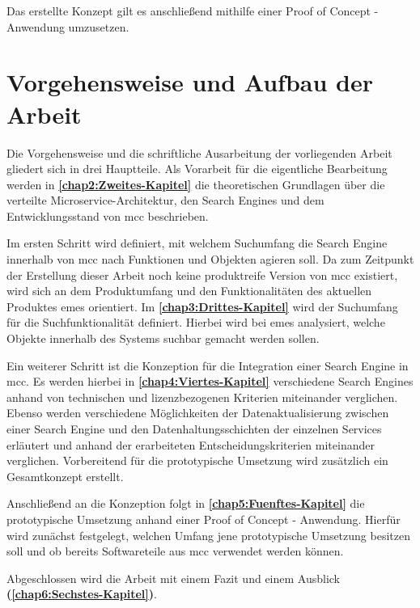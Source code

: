 Das erstellte Konzept gilt es anschließend mithilfe einer Proof of Concept - Anwendung umzusetzen.

\section{Vorgehensweise und Aufbau der Arbeit\label{sec1.3:Unterpunkt-3}}

Die Vorgehensweise und die schriftliche Ausarbeitung der vorliegenden Arbeit gliedert sich in drei Hauptteile. Als Vorarbeit für die eigentliche Bearbeitung werden in \textbf{\autoref{chap2:Zweites-Kapitel}} die theoretischen Grundlagen über die verteilte Microservice-Architektur, den Search Engines und dem Entwicklungsstand von \gls{mcc} beschrieben.

Im ersten Schritt wird definiert, mit welchem Suchumfang die Search Engine innerhalb von \gls{mcc} nach Funktionen und Objekten agieren soll. Da zum Zeitpunkt der Erstellung dieser Arbeit noch keine produktreife Version von \gls{mcc} existiert, wird sich an dem Produktumfang und den Funktionalitäten des aktuellen Produktes \gls{emes} orientiert. Im \textbf{\autoref{chap3:Drittes-Kapitel}} wird der Suchumfang für die Suchfunktionalität definiert. Hierbei wird bei \gls{emes} analysiert, welche Objekte innerhalb des Systems \glqq suchbar\grqq{} gemacht werden sollen.

Ein weiterer Schritt ist die Konzeption für die Integration einer Search Engine in \gls{mcc}. Es werden hierbei in \textbf{\autoref{chap4:Viertes-Kapitel}} verschiedene Search Engines anhand von technischen und lizenzbezogenen Kriterien miteinander verglichen. Ebenso werden verschiedene Möglichkeiten der Datenaktualisierung zwischen einer Search Engine und den Datenhaltungsschichten der einzelnen Services erläutert und anhand der erarbeiteten Entscheidungskriterien miteinander verglichen. Vorbereitend für die prototypische Umsetzung wird zusätzlich ein Gesamtkonzept erstellt.

Anschließend an die Konzeption folgt in \textbf{\autoref{chap5:Fuenftes-Kapitel}} die prototypische Umsetzung anhand einer Proof of Concept - Anwendung. Hierfür wird zunächst festgelegt, welchen Umfang jene prototypische Umsetzung besitzen soll und ob bereits Softwareteile aus \gls{mcc} verwendet werden können.

Abgeschlossen wird die Arbeit mit einem Fazit und einem Ausblick \textbf{(\autoref{chap6:Sechstes-Kapitel})}.